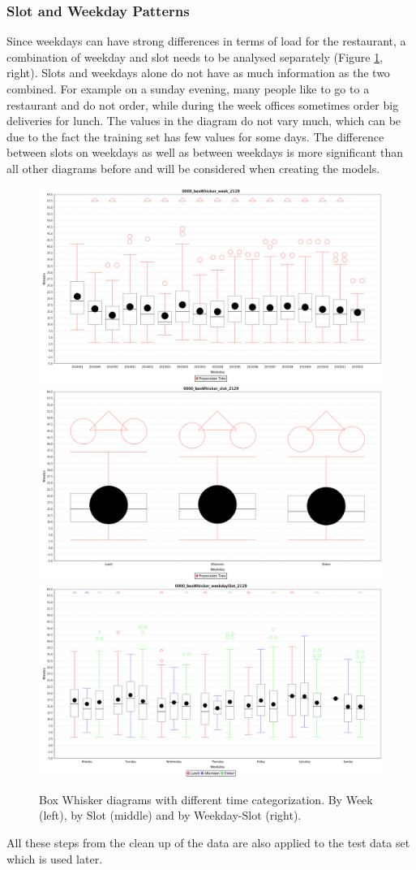 \subsubsection{Slot and Weekday Patterns}
Since weekdays can have strong differences in terms of load for the restaurant, a combination of weekday and slot needs to be analysed separately (Figure \ref{fig:triple_boxWhisker}, right).
Slots and weekdays alone do not have as much information as the two combined. For example on a sunday evening, many people like to go to a restaurant and do not order, while during the week offices sometimes order big deliveries for lunch. The values in the diagram do not vary much, which can be due to the fact the training set has few values for some days.\newline
The difference between slots on weekdays as well as between weekdays is more significant than all other diagrams before and will be considered when creating the models.

\begin{figure}[htp]

\centering
\includegraphics[width=.3\textwidth]{images/0000_boxWhisker_week_2129.png}\hfill
\includegraphics[width=.3\textwidth]{images/0000_boxWhisker_slot_2129.png}\hfill
\includegraphics[width=.3\textwidth]{images/0000_boxWhisker_weekdaySlot_2129.png}

\caption{Box Whisker diagrams with different time categorization. By Week (left), by Slot (middle) and by Weekday-Slot (right).}
\label{fig:triple_boxWhisker}

\end{figure}

All these steps from the clean up of the data are also applied to the test data set which is used later.

